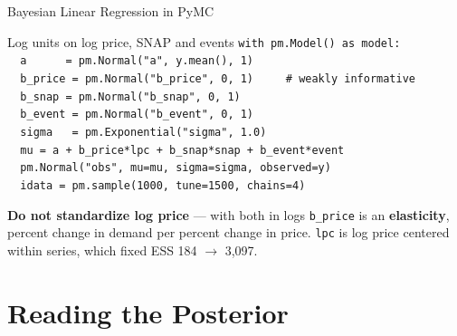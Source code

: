 \documentclass[aspectratio=169, 11pt]{beamer}
\begin{document}
\begin{frame}{Bayesian Linear Regression in PyMC}
  \begin{examplebox}{Log units on log price, SNAP and events}
    {\tiny\linespread{1.0}\selectfont
    \texttt{with pm.Model() as model:}\\
    \texttt{\ \ a\ \ \ \ \ \ = pm.Normal("a", y.mean(), 1)}\\
    \texttt{\ \ b\_price = pm.Normal("b\_price", 0, 1)\ \ \ \ \ \# weakly informative}\\
    \texttt{\ \ b\_snap\ = pm.Normal("b\_snap",\ 0, 1)}\\
    \texttt{\ \ b\_event = pm.Normal("b\_event", 0, 1)}\\
    \texttt{\ \ sigma\ \ \ = pm.Exponential("sigma", 1.0)}\\
    \texttt{\ \ mu = a + b\_price*lpc + b\_snap*snap + b\_event*event}\\
    \texttt{\ \ pm.Normal("obs", mu=mu, sigma=sigma, observed=y)}\\
    \texttt{\ \ idata = pm.sample(1000, tune=1500, chains=4)}
    }
  \end{examplebox}
  \textbf{Do not standardize log price} --- with both in logs \texttt{b\_price} is an
  \textbf{elasticity}, percent change in demand per percent change in price. \texttt{lpc} is log
  price centered within series, which fixed ESS 184 $\rightarrow$ 3{,}097.

\end{frame}

\section{Reading the Posterior}

\end{document}
